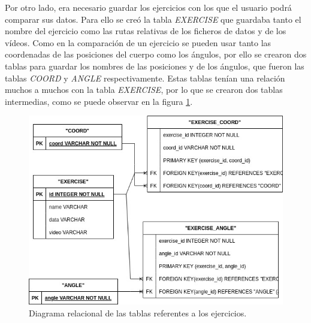 Por otro lado, era necesario guardar los ejercicios con los que el usuario podrá comparar sus datos. Para ello se creó la tabla \textit{EXERCISE} que guardaba tanto el nombre del ejercicio como las rutas relativas de los ficheros de datos y de los vídeos. Como en la comparación de un ejercicio se pueden usar tanto las coordenadas de las posiciones del cuerpo como los ángulos, por ello se crearon dos tablas para guardar los nombres de las posiciones y de los ángulos, que fueron las tablas \textit{COORD} y \textit{ANGLE} respectivamente. Estas tablas tenían una relación muchos a muchos con la tabla \textit{EXERCISE}, por lo que se crearon dos tablas intermedias, como se puede observar en la figura \ref{fig:tablas-exercises}.

\begin{figure}
	\centering
	\includegraphics[width=0.7\linewidth]{img/tablas-Exercises}
	\caption{Diagrama relacional de las tablas referentes a los ejercicios.}
	\label{fig:tablas-exercises}
\end{figure}

